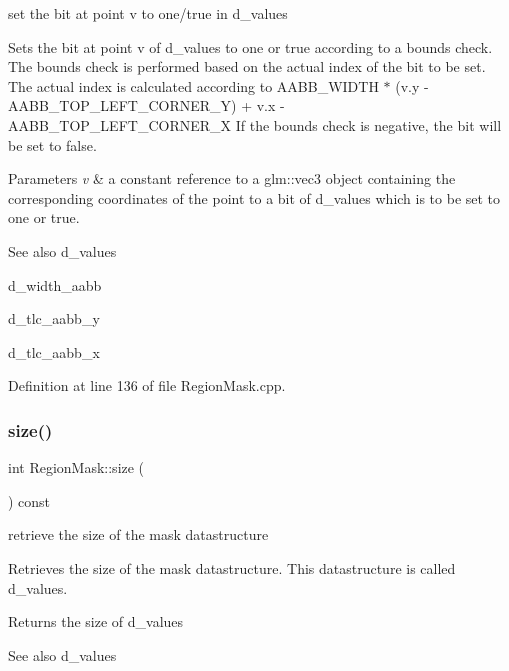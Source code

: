 set the bit at point v to one/true in d\+\_\+values 

Sets the bit at point v of d\+\_\+values to one or true according to a bounds check. The bounds check is performed based on the actual index of the bit to be set. The actual index is calculated according to A\+A\+B\+B\+\_\+\+W\+I\+D\+TH $\ast$ (v.\+y -\/ A\+A\+B\+B\+\_\+\+T\+O\+P\+\_\+\+L\+E\+F\+T\+\_\+\+C\+O\+R\+N\+E\+R\+\_\+Y) + v.\+x -\/ A\+A\+B\+B\+\_\+\+T\+O\+P\+\_\+\+L\+E\+F\+T\+\_\+\+C\+O\+R\+N\+E\+R\+\_\+X If the bounds check is negative, the bit will be set to false.


\begin{DoxyParams}{Parameters}
{\em v} & a constant reference to a glm\+::vec3 object containing the corresponding coordinates of the point to a bit of d\+\_\+values which is to be set to one or true.\\
\hline
\end{DoxyParams}
\begin{DoxySeeAlso}{See also}
d\+\_\+values 

d\+\_\+width\+\_\+aabb 

d\+\_\+tlc\+\_\+aabb\+\_\+y 

d\+\_\+tlc\+\_\+aabb\+\_\+x 
\end{DoxySeeAlso}


Definition at line 136 of file Region\+Mask.\+cpp.

\mbox{\label{class_region_mask_aace9314c3879fbcb5d4bce19a2f4e8cf}} 
\subsubsection{\texorpdfstring{size()}{size()}}
{\footnotesize\ttfamily int Region\+Mask\+::size (\begin{DoxyParamCaption}{ }\end{DoxyParamCaption}) const}



retrieve the size of the mask datastructure 

Retrieves the size of the mask datastructure. This datastructure is called d\+\_\+values.

\begin{DoxyReturn}{Returns}
the size of d\+\_\+values
\end{DoxyReturn}
\begin{DoxySeeAlso}{See also}
d\+\_\+values 
\end{DoxySeeAlso}



